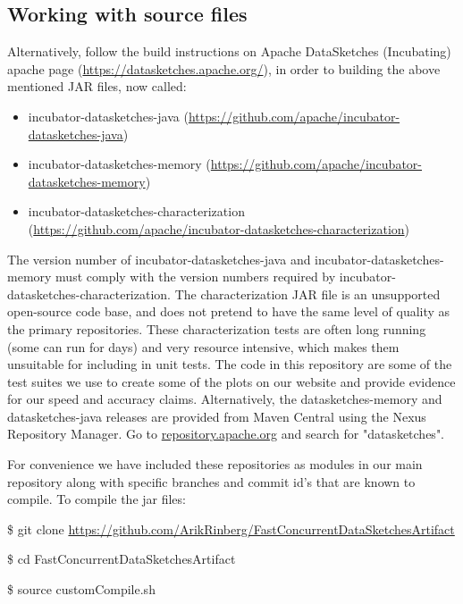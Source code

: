 \subsection{Working with source files}

Alternatively, follow the build instructions on Apache DataSketches (Incubating) apache
page (\url{https://datasketches.apache.org/}), in order to building the above mentioned
JAR files, now called:
\begin{itemize}
  \item incubator-datasketches-java (\url{https://github.com/apache/incubator-datasketches-java})
  \item incubator-datasketches-memory (\url{https://github.com/apache/incubator-datasketches-memory})
  \item incubator-datasketches-characterization (\url{https://github.com/apache/incubator-datasketches-characterization})
\end{itemize}

\noindent The version number of incubator-datasketches-java
and incubator-datasketches-memory must comply with the version numbers required by incubator-datasketches-characterization.
The characterization JAR file is an unsupported open-source code base, and
does not pretend to have the same level of quality as the primary repositories.
These characterization tests are often long running (some can run for days) and very resource intensive, which makes
them unsuitable for including in unit tests. The code in this repository are some of
the test suites we use to create some of the plots on our website and provide evidence for our speed and accuracy claims.
Alternatively, the datasketches-memory and datasketches-java releases are provided from Maven Central using the Nexus Repository Manager. Go to 
\url{repository.apache.org} and search for "datasketches".

For convenience we have included these repositories as modules in our main repository along with specific branches and commit id's
that are known to compile. To compile the jar files:
\begin{framed}

\$ git clone \url{https://github.com/ArikRinberg/FastConcurrentDataSketchesArtifact}

\$ cd FastConcurrentDataSketchesArtifact

\$ source customCompile.sh

\end{framed}

